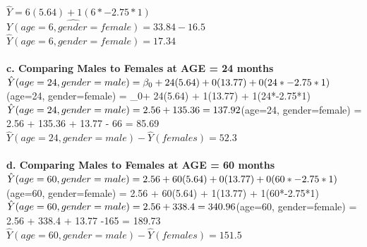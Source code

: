 \documentclass{article}
\begin{document}
\noindent $\hat{Y} =  6(5.64) + 1(6*-2.75*1) $ \\
$\hat{Y(age=6, gender=female)} =   33.84 - 16.5 $ \\
$\hat{Y}(age=6, gender=female) =   17.34$ \\

 \\


\noindent \textbf{c. Comparing Males to Females at AGE = 24 months} \\
$\hat{Y}(age=24, gender=male) = \beta_0+ 24(5.64) + 0(13.77) + 0(24*-2.75*1) \\ 
$(age=24, gender=female) = \beta_0+ 24(5.64) + 1(13.77) + 1(24*-2.75*1) \\ 

\noindent $\hat{Y}(age=24, gender=male) = 2.56 + 135.36 = 137.92  \\ 
$(age=24, gender=female) = 2.56 + 135.36 + 13.77 - 66 = 85.69 \\ 
\noindent $\hat{Y}(age=24, gender=male) - \hat{Y}(females) = 52.3$ \\

 \\



\noindent \textbf{d. Comparing Males to Females at AGE = 60 months} \\
$\hat{Y}(age=60, gender=male) =  2.56 + 60(5.64) + 0(13.77) + 0(60*-2.75*1) \\ 
$(age=60, gender=female) = 2.56 + 60(5.64) + 1(13.77) + 1(60*-2.75*1) \\ 

\noindent $\hat{Y}(age=60, gender=male) = 2.56 + 338.4 = 340.96 \\ 
$(age=60, gender=female) =  2.56 + 338.4 + 13.77 -165 = 189.73\\ 
\noindent $\hat{Y}(age=60, gender=male) - \hat{Y}(females) = 151.5 $ \\

 \\
\end{document}
